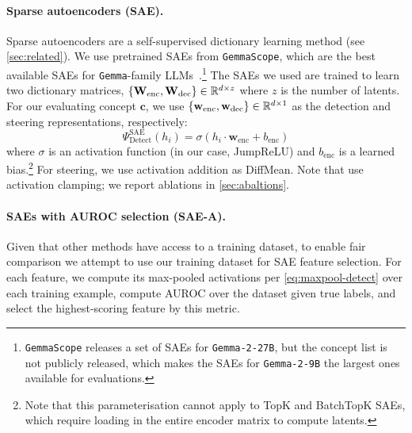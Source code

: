 \documentclass{article}
\theoremstyle{plain}
\theoremstyle{definition}
\theoremstyle{remark}
\renewcommand{\cite}{\citep}
\newcommand{\methodtag}[2]{%
  \tikz[baseline=(char.base)]{%
    \node[
      fill=#1,
      rounded corners=2pt,
      text=white,
      font=\bfseries,
      minimum width=1em,
      minimum height=1em,
      align=center,
      inner sep=0pt
    ](char){#2};%
  }%
}
\newcommand{\concepttag}{\protect\methodtag{conceptcolor}{C}}
\newcommand{\steeringtag}{\protect\methodtag{steeringcolor}{S}}
\begin{document}
\paragraph{\concepttag{}\steeringtag{} Sparse autoencoders (SAE).} Sparse autoencoders are a self-supervised dictionary learning method (see \cref{sec:related}). We use pretrained SAEs from \texttt{GemmaScope}, which are the best available SAEs for \texttt{Gemma}-family LLMs~\cite{lieberum-etal-2024-gemma}.\footnote{\texttt{GemmaScope} releases a set of SAEs for \texttt{Gemma-2-27B}, but the concept list is not publicly released, which makes the SAEs for \texttt{Gemma-2-9B} the largest ones available for evaluations.}
The SAEs we used are trained to learn two dictionary matrices, $\{\mathbf{W}_{\mathrm{enc}}, \mathbf{W}_{\mathrm{dec}}\} \in \mathbb{R}^{d\times z}$ where $z$ is the number of latents. For our evaluating concept $\mathbf{c}$, we use $\{\mathbf{w}_{\mathrm{enc}}, \mathbf{w}_{\mathrm{dec}}\} \in \mathbb{R}^{d \times 1}$ as the detection and steering representations, respectively:
\[
\Psi_{\text{Detect}}^{\text{SAE}}(h_i) = \sigma\left(h_i \cdot \mathbf{w}_{ 
 \textrm{enc}} + b_{\textrm{enc}} \right)
\]
where $\sigma$ is an activation function (in our case, JumpReLU) and $b_{\text{enc}}$ is a learned bias.\footnote{Note that this parameterisation cannot apply to TopK \cite{gao2024scalingevaluatingsparseautoencoders} and BatchTopK SAEs, which require loading in the entire encoder matrix to compute latents.}
For steering, we use activation addition as DiffMean.
Note that \citet{templeton2024scaling} use activation clamping; we report ablations in \cref{sec:abaltions}.

\paragraph{\concepttag{}\steeringtag{} SAEs with AUROC selection (SAE-A).} Given that other methods have access to a training dataset, to enable fair comparison we attempt to use our training dataset for SAE feature selection. For each feature, we compute its max-pooled activations per \cref{eq:maxpool-detect} over each training example, compute AUROC over the dataset given true labels, and select the highest-scoring feature by this metric.
\end{document}
